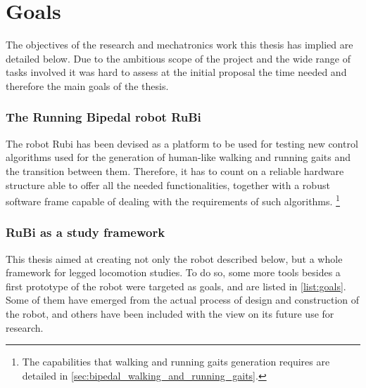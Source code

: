 \section{Goals}
\label{sec:goals}
The objectives of the research and mechatronics work this thesis has implied are detailed below.
Due to the ambitious scope of the project and the wide range of tasks involved it was hard to assess at the initial proposal the time needed and therefore the main goals of the thesis. 

\subsubsection{The Running Bipedal robot RuBi} %
\label{ssub:the_running_bipedal_robot_rubi}
The robot Rubi has been devised as a platform to be used for testing new control algorithms used for the generation of human-like walking and running gaits and the transition between them.
Therefore, it has to count on a reliable hardware structure able to offer all the needed functionalities, together with a robust software frame capable of dealing with the requirements of such algorithms. \footnote{The capabilities that walking and running gaits generation requires are detailed in \ref{sec:bipedal_walking_and_running_gaits}.}


\subsubsection{RuBi as a study framework} %
\label{ssub:rubi_as_a_study_framework}
This thesis aimed at creating not only the robot described below, but a whole framework for legged locomotion studies.
To do so, some more tools besides a first prototype of the robot were targeted as goals, and are listed in \ref{list:goals}.
Some of them have emerged from the actual process of design and construction of the robot, and others have been included with the view on its future use for research.

